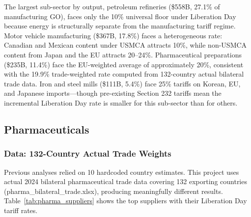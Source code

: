 \documentclass[12pt]{article}
\begin{document}
\noindent
The largest sub-sector by output, petroleum refineries (\$558B, 27.1\% of
manufacturing GO), faces only the 10\% universal floor under Liberation Day
because energy is structurally separate from the manufacturing tariff regime.
Motor vehicle manufacturing (\$367B, 17.8\%) faces a heterogeneous rate: Canadian
and Mexican content under USMCA attracts 10\%, while non-USMCA content from Japan
and the EU attracts 20--24\%. Pharmaceutical preparations (\$235B, 11.4\%) face
the EU-weighted average of approximately 20\%, consistent with the 19.9\%
trade-weighted rate computed from 132-country actual bilateral trade data.
Iron and steel mills (\$111B, 5.4\%) face 25\% tariffs on Korean, EU, and
Japanese imports---though pre-existing Section 232 tariffs mean the incremental
Liberation Day rate is smaller for this sub-sector than for others.

\subsection{Pharmaceuticals}

\subsubsection{Data: 132-Country Actual Trade Weights}

Previous analyses relied on 10 hardcoded country estimates. This project
uses actual 2024 bilateral pharmaceutical trade data covering 132 exporting
countries (pharma\_bilateral\_trade.xlsx), producing meaningfully different
results. Table~\ref{tab:pharma_suppliers} shows the top suppliers with their
Liberation Day tariff rates.
\end{document}
